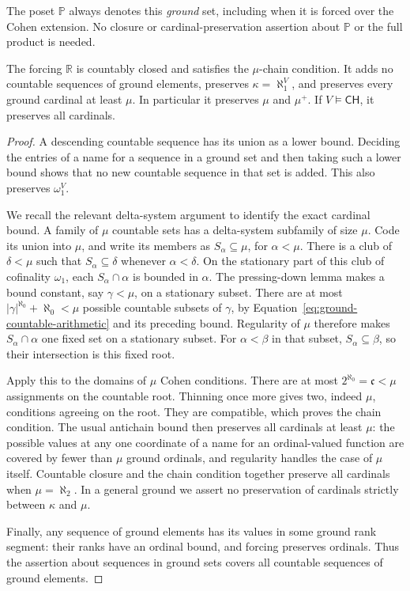 The poset \(\mathbb P\) always denotes this \emph{ground} set,
including when it is forced over the Cohen extension.
No closure or cardinal-preservation assertion about \(\mathbb P\)
or the full product is needed.

\begin{lemma}\label{lem:cohen-properties}
The forcing \(\mathbb R\) is countably closed and satisfies the
\(\mu\)-chain condition.  It adds no countable sequences of ground
elements, preserves \(\kappa=\aleph_1^V\), and preserves every
ground cardinal at least \(\mu\).  In particular it preserves
\(\mu\) and \(\mu^+\).
If \(V\models\mathsf{CH}\), it preserves all cardinals.
\end{lemma}

\begin{proof}
A descending countable sequence has its union as a lower bound.
Deciding the entries of a name for a sequence in a ground set and
then taking such a lower bound shows that no new countable sequence
in that set is added.  This also preserves \(\omega_1^V\).

We recall the relevant delta-system argument to identify the exact
cardinal bound.  A family of \(\mu\) countable sets has a delta-system
subfamily of size \(\mu\).  Code its union into \(\mu\), and write
its members as \(S_\alpha\subseteq\mu\), for \(\alpha<\mu\).
There is a club of \(\delta<\mu\) such that
\(S_\alpha\subseteq\delta\) whenever \(\alpha<\delta\).
On the stationary part of this club of cofinality \(\omega_1\),
each \(S_\alpha\cap\alpha\) is bounded in \(\alpha\).
The pressing-down lemma makes a bound constant, say \(\gamma<\mu\),
on a stationary subset.  There are at most
\(|\gamma|^{\aleph_0}+\aleph_0<\mu\) possible countable subsets
of \(\gamma\), by
Equation~\eqref{eq:ground-countable-arithmetic} and its preceding
bound.  Regularity of \(\mu\) therefore makes
\(S_\alpha\cap\alpha\) one fixed set on a stationary subset.
For \(\alpha<\beta\) in that subset,
\(S_\alpha\subseteq\beta\), so their intersection is this fixed root.

Apply this to the domains of \(\mu\) Cohen conditions.
There are at most \(2^{\aleph_0}=\mathfrak c<\mu\)
assignments on the countable root.  Thinning once more gives two,
indeed \(\mu\), conditions agreeing on the root.  They are compatible,
which proves the chain condition.
The usual antichain bound then preserves all cardinals at least
\(\mu\): the possible values at any one coordinate of a name for
an ordinal-valued function are covered by fewer than \(\mu\)
ground ordinals, and regularity handles the case of \(\mu\) itself.
Countable closure and the chain condition together preserve all
cardinals when \(\mu=\aleph_2\).
In a general ground we assert no preservation of cardinals strictly
between \(\kappa\) and \(\mu\).

Finally, any sequence of ground elements has its values in some ground
rank segment: their ranks have an ordinal bound, and forcing preserves
ordinals.  Thus the assertion about sequences in ground sets covers
all countable sequences of ground elements.
\end{proof}


